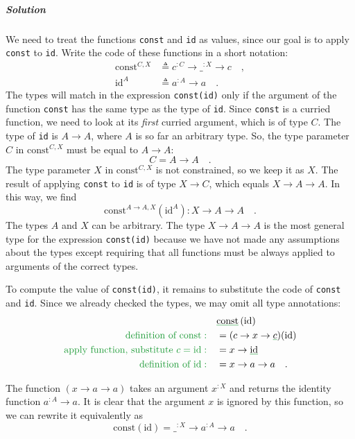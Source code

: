 \subparagraph{Solution}

We need to treat the functions \lstinline!const! and \lstinline!id!
as values, since our goal is to apply \lstinline!const! to \lstinline!id!.
Write the code of these functions in a short notation:
\begin{align*}
\text{const}^{C,X} & \triangleq c^{:C}\rightarrow\_^{:X}\rightarrow c\quad,\\
\text{id}^{A} & \triangleq a^{:A}\rightarrow a\quad.
\end{align*}
The types will match in the expression \lstinline!const(id)! only
if the argument of the function \lstinline!const! has the same type
as the type of \lstinline!id!. Since \lstinline!const! is a curried
function, we need to look at its \emph{first} curried argument, which
is of type $C$. The type of \lstinline!id! is $A\rightarrow A$,
where $A$ is so far an arbitrary type. So, the type parameter $C$
in $\text{const}^{C,X}$ must be equal to $A\rightarrow A$:
\[
C=A\rightarrow A\quad.
\]
 The type parameter $X$ in $\text{const}^{C,X}$ is not constrained,
so we keep it as $X$. The result of applying \lstinline!const! to
\lstinline!id! is of type $X\rightarrow C$, which equals $X\rightarrow A\rightarrow A$.
In this way, we find 
\[
\text{const}^{A\rightarrow A,X}(\text{id}^{A}):X\rightarrow A\rightarrow A\quad.
\]
The types $A$ and $X$ can be arbitrary. The type $X\rightarrow A\rightarrow A$
is the most general type for the expression \lstinline!const(id)!
because we have not made any assumptions about the types except requiring
that all functions must be always applied to arguments of the correct
types.

To compute the value of \lstinline!const(id)!, it remains to substitute
the code of \lstinline!const! and \lstinline!id!. Since we already
checked the types, we may omit all type annotations:
\begin{align*}
 & \gunderline{\text{const}}\left(\text{id}\right)\\
{\color{greenunder}\text{definition of const}:}\quad & =(c\rightarrow x\rightarrow\gunderline c)(\text{id})\\
{\color{greenunder}\text{apply function, substitute }c=\text{id}:}\quad & =x\rightarrow\gunderline{\text{id}}\\
{\color{greenunder}\text{definition of }\text{id}:}\quad & =x\rightarrow a\rightarrow a\quad.
\end{align*}

The function $\left(x\rightarrow a\rightarrow a\right)$ takes an
argument $x^{:X}$ and returns the identity function $a^{:A}\rightarrow a$.
It is clear that the argument $x$ is ignored by this function, so
we can rewrite it equivalently as
\[
\text{const}\left(\text{id}\right)=\_^{:X}\rightarrow a^{:A}\rightarrow a\quad.
\]


